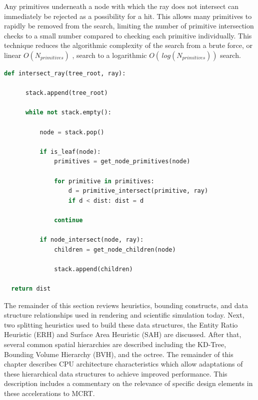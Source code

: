 Any primitives underneath a node with which the ray does not intersect can
immediately be rejected as a possibility for a hit. This allows many primitives
to rapidly be removed from the search, limiting the number of primitive
intersection checks to a small number compared to checking each primitive
individually. This technique reduces the algorithmic complexity of the search
from a brute force, or linear $O(N_{primitives})$ , search to a logarithmic
$O(\, log(N_{primitives}))$ search.

\newpage

\begin{lstlisting}[language=Python,basicstyle=\tiny,caption={[A general spatial hierarchy traversal algorithm.]{General algorithm for spatial hierarchy traversal to return the nearest intersection along a ray.}},label={alg:bvh_traversal},captionpos=b]
  def intersect_ray(tree_root, ray):

      stack.append(tree_root)

      while not stack.empty():

          node = stack.pop()

          if is_leaf(node):
              primitives = get_node_primitives(node)

              for primitive in primitives:
                  d = primitive_intersect(primitive, ray)
                  if d < dist: dist = d

              continue

          if node_intersect(node, ray):
              children = get_node_children(node)

              stack.append(children)

  return dist
\end{lstlisting}

The remainder of this section reviews heuristics, bounding constructs, and data
structure relationships used in rendering and scientific simulation
today. Next, two splitting heuristics used to build these data structures, the Entity Ratio Heuristic (ERH) and
Surface Area Heuristic (SAH) are discussed. After that, several common spatial
hierarchies are described including the KD-Tree, Bounding Volume Hierarchy
(BVH), and the octree. The remainder of this chapter describes CPU architecture
characteristics which allow adaptations of these hierarchical data structures to
achieve improved performance. This description includes a commentary on the
relevance of specific design elements in these accelerations to MCRT.

